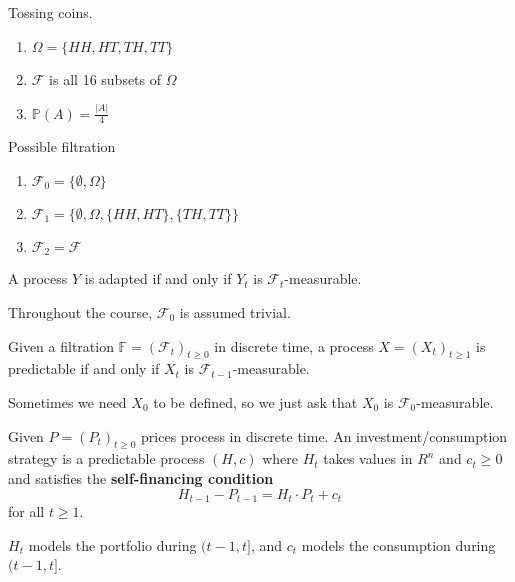 \begin{exmp}
  Tossing coins.
  \begin{enumerate}
  \item $\Omega = \{ HH, HT, TH, TT \}$
  \item $\mathcal{F}$ is all 16 subsets of $\Omega$
  \item $\mathbb{P}(A) = \frac{|A|}{4}$
  \end{enumerate}

  Possible filtration
  \begin{enumerate}
  \item $\mathcal{F}_{0} = \{ \emptyset, \Omega \}$
  \item $\mathcal{F}_{1} = \{ \emptyset, \Omega, \{ HH, HT \}, \{ TH,
    TT \} \}$
  \item $\mathcal{F}_{2} = \mathcal{F}$
  \end{enumerate}
\end{exmp}

\begin{defn}
  \label{defn:4}
  A process $Y$ is adapted if and only if $Y_{t}$ is $\mathcal{F}_{t}$-measurable.
\end{defn}

Throughout the course, $\mathcal{F}_{0}$ is assumed trivial.

\begin{defn}
  \label{defn:discrete_time_models:1}
  Given a filtration $\mathbb{F} = (\mathcal{F}_{t})_{t \geq 0}$ in
  discrete time, a process $X = (X_{t})_{t \geq 1}$ is predictable if
  and only if $X_{t}$ is $\mathcal{F}_{t-1}$-measurable.

  Sometimes we need $X_{0}$ to be defined, so we just ask that $X_{0}$
  is $\mathcal{F}_{0}$-measurable.
\end{defn}

\begin{defn}
  \label{defn:discrete_time_models:2}
  Given $P = (P_{t})_{t \geq 0}$ prices process in discrete time.  An
  investment/consumption strategy is a predictable process $(H, c)$
  where $H_{t}$ takes values in $R^{n}$ and $c_{t} \geq 0$ and
  satisfies the \textbf{self-financing condition}
  \begin{equation}
    \label{eq:1}
    H_{t - 1} - P_{t - 1} = H_{t} \cdot P_{t} + c_{t}
  \end{equation} for all $t \geq 1$.
\end{defn}

$H_{t}$ models the portfolio during $(t - 1, t]$, and $c_{t}$ models
the consumption during $(t-1, t]$.

